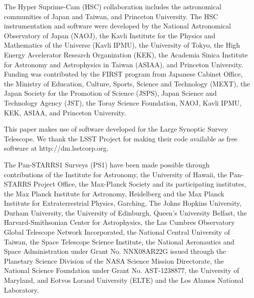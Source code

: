 \documentclass[useamsfonts]{pasj01}
\begin{document}
  
\begin{ack}
    \label{sec:ack}
    
    The Hyper Suprime-Cam (HSC) collaboration includes the astronomical communities of 
    Japan and Taiwan, and Princeton University.  
    The HSC instrumentation and software were developed by the National Astronomical 
    Observatory of Japan (NAOJ), the Kavli Institute for the Physics and Mathematics of
    the Universe (Kavli IPMU), the University of Tokyo, the High Energy Accelerator 
    Research Organization (KEK), the Academia Sinica Institute for Astronomy and 
    Astrophysics in Taiwan (ASIAA), and Princeton University.
    Funding was contributed by the FIRST program from Japanese Cabinet Office, the 
    Ministry of Education, Culture, Sports, Science and Technology (MEXT), the Japan 
    Society for the Promotion of Science (JSPS), Japan Science and Technology Agency 
    (JST), the Toray Science  Foundation, NAOJ, Kavli IPMU, KEK, ASIAA, and Princeton 
    University.
    
    This paper makes use of software developed for the Large Synoptic Survey Telescope. 
    We thank the LSST Project for making their code available as free software at 
    http://dm.lsstcorp.org.

    The Pan-STARRS1 Surveys (PS1) have been made possible through contributions of the 
    Institute for Astronomy, the University of Hawaii, the Pan-STARRS Project Office, 
    the Max-Planck Society and its participating institutes, the Max Planck Institute 
    for Astronomy, Heidelberg and the Max Planck Institute for Extraterrestrial Physics, 
    Garching, The Johns Hopkins University, Durham University, the University of 
    Edinburgh, Queen's University Belfast, the Harvard-Smithsonian Center for Astrophysics, 
    the Las Cumbres Observatory Global Telescope Network Incorporated, the National 
    Central University of Taiwan, the Space Telescope Science Institute, the National 
    Aeronautics and Space Administration under Grant No. 
    NNX08AR22G issued through the Planetary Science Division of the NASA Science 
    Mission Directorate, the National Science Foundation under Grant No. AST-1238877, 
    the University of Maryland, and Eotvos Lorand University (ELTE) and the Los Alamos 
    National Laboratory.
   

\end{ack}
\end{document}
